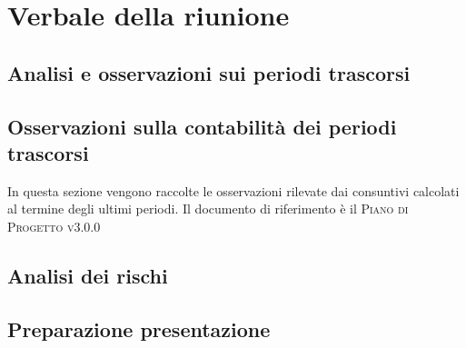 \section{Verbale della riunione}

\subsection{Analisi e osservazioni sui periodi trascorsi}



\subsection{Osservazioni sulla contabilità dei periodi trascorsi}

In questa sezione vengono raccolte le osservazioni rilevate dai consuntivi calcolati al termine degli ultimi periodi. Il documento di riferimento è il \textsc{Piano di Progetto v3.0.0}

\subsection{Analisi dei rischi}



\subsection{Preparazione presentazione}